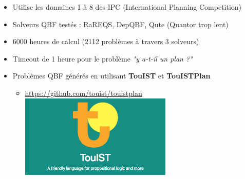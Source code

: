 \documentclass[english,french,usenames,dvipsnames]{beamer}
\begin{document}
\begin{frame}
\begin{itemize}

\item Utilise les domaines 1 à 8 des IPC (International  Planning Competition)
\item Solveurs QBF testés : RaREQS, DepQBF, Qute (Quantor trop lent)
\item {\color{red}6000 heures} de calcul (2112 problèmes à travers 3 solveurs)
\item Timeout de 1 heure pour le problème \textit{"y a-t-il un plan ?"}
\item Problèmes QBF générés en utilisant \textbf{TouIST} et \textbf{TouISTPlan}
\begin{itemize}
\item \url{https://github.com/touist/touistplan}
\includegraphics[width=0.6\textwidth]{figures/coplas2018/touist.png}
\end{itemize}
\end{itemize}
\end{frame}
\end{document}
